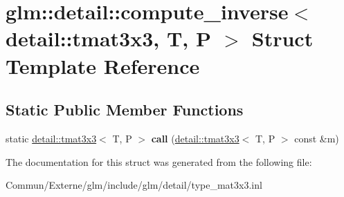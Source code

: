 \hypertarget{structglm_1_1detail_1_1compute__inverse_3_01detail_1_1tmat3x3_00_01_t_00_01_p_01_4}{}\section{glm\+:\+:detail\+:\+:compute\+\_\+inverse$<$ detail\+:\+:tmat3x3, T, P $>$ Struct Template Reference}
\label{structglm_1_1detail_1_1compute__inverse_3_01detail_1_1tmat3x3_00_01_t_00_01_p_01_4}
\subsection*{Static Public Member Functions}
\begin{DoxyCompactItemize}
\item 
static \hyperlink{structglm_1_1detail_1_1tmat3x3}{detail\+::tmat3x3}$<$ T, P $>$ {\bfseries call} (\hyperlink{structglm_1_1detail_1_1tmat3x3}{detail\+::tmat3x3}$<$ T, P $>$ const \&m)\hypertarget{structglm_1_1detail_1_1compute__inverse_3_01detail_1_1tmat3x3_00_01_t_00_01_p_01_4_ac49eb426ffee6a5ebf1ee02e45c0a159}{}\label{structglm_1_1detail_1_1compute__inverse_3_01detail_1_1tmat3x3_00_01_t_00_01_p_01_4_ac49eb426ffee6a5ebf1ee02e45c0a159}

\end{DoxyCompactItemize}


The documentation for this struct was generated from the following file\+:\begin{DoxyCompactItemize}
\item 
Commun/\+Externe/glm/include/glm/detail/type\+\_\+mat3x3.\+inl\end{DoxyCompactItemize}
